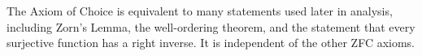 \begin{remark*}
The Axiom of Choice is equivalent to many statements used later in analysis,
including Zorn's Lemma, the well-ordering theorem, and the statement that every
surjective function has a right inverse. It is independent of the other ZFC
axioms.
\end{remark*}
